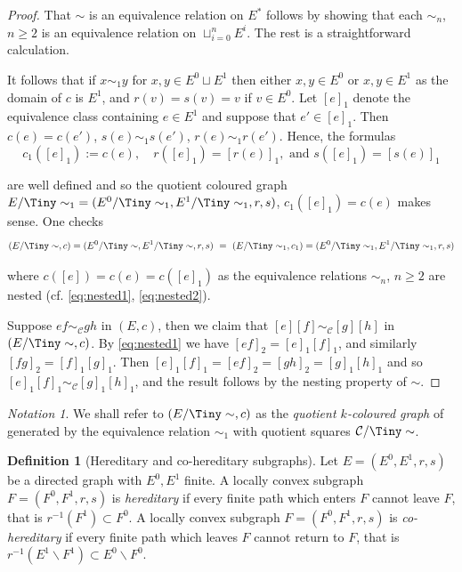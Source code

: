 \documentclass[12pt]{amsart}
\theoremstyle{definition}
\newtheorem{dfn}[thm]{Definition}
\theoremstyle{remark}
\newtheorem{nota}[thm]{Notation}
\numberwithin{equation}{section}
\newcommand{\Cc}{\mathcal{C}}
\begin{document}
\begin{proof}
That $\sim$ is an equivalence relation on $E^*$ follows by showing that each $\sim_n$, $n \ge2$ is an equivalence relation on $\sqcup_{i=0}^n E^i$. The rest is a straightforward calculation.

It follows that if $x \sim_1 y$ for $x,y \in E^0 \sqcup E^1$ then either $x,y \in E^0$ or $x,y \in E^1$ as the domain of $c$ is $E^1$, and $r(v)=s(v)=v$ if $v \in E^0$. Let $[e]_1$ denote the equivalence class containing $e \in E^1$ and suppose that $e' \in [e]_1$. Then $c(e) = c(e')$, $s(e) \sim_1 s(e')$, $r(e) \sim_1 r(e')$. Hence, the formulas
\[
c_1([e]_1) := c(e), \quad r([e]_1) = [r(e)]_1,\text{ and } s([e]_1) = [s(e)]_1
\]

\noindent
are well defined and so the quotient coloured graph $E/{\Tiny\sim_1}  = (E^0/{\Tiny\sim_1},E^1/{\Tiny\sim_1},r,s)$, $c_1([e]_1)=c(e)$ makes sense. One checks
\[
(E/{\Tiny\sim} ,c) = (E^0/{\Tiny\sim},E^1/{\Tiny\sim},r,s) ~=~ (E/{\Tiny\sim_1},c_1)   = (E^0/{\Tiny\sim_1},E^1/{\Tiny\sim_1},r,s)
\]

\noindent
where $c([e])=c(e)=c([e]_1)$ as the equivalence relations $\sim_n$, $n \ge 2$ are nested (cf. \eqref{eq:nested1}, \eqref{eq:nested2}). 

Suppose $ef \sim_\Cc gh$ in $(E,c)$, then we claim that $[e][f] \sim_\Cc [g][h]$ in $(E/{\Tiny\sim},c)$. By \eqref{eq:nested1} we have $[ef]_2 = [e]_1 [f]_1$, and similarly $[fg]_2 = [f]_1 [g]_1$. Then $[e]_1 [f]_1 = [ef]_2 = [gh]_2 = [g]_1 [h]_1$ and so $[e]_1 [f]_1 \sim_\Cc [g]_1 [h]_1$, and the result follows by the nesting property of $\sim$.
\end{proof}

\begin{nota}
We shall refer to $(E/{\Tiny\sim} ,c)$ as the \emph{quotient $k$-coloured graph} of generated by the equivalence relation $\sim_1$ with quotient squares $\Cc / 
{\Tiny\sim}$.
\end{nota}

\begin{dfn}[Hereditary and co-hereditary subgraphs]
Let $E=(E^0,E^1,r,s)$ be a directed graph with $E^0,E^1$ finite. A locally convex subgraph $F=(F^0,F^1,r,s)$ is \emph{hereditary} if every finite path which enters $F$ cannot leave $F$, that is $r^{-1} ( F^1) \subset F^0$. A locally convex subgraph $F=(F^0,F^1,r,s)$ is \emph{co-hereditary} if every finite path which leaves $F$ cannot return to $F$, that is $r^{-1} ( E^1 \backslash F^1) \subset E^0 \backslash F^0$.
\end{dfn}
\end{document}
